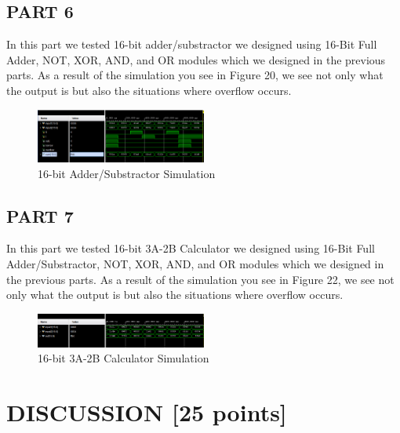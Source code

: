 \documentclass[pdftex,12pt,a4paper]{article}
\begin{document}
\subsection{PART 6}

In this part we tested 16-bit adder/substractor we designed using 16-Bit Full Adder, NOT, XOR, AND, and OR modules which we designed in the previous parts. As a result of the simulation you see in Figure 20, we see not only what the output is but also the situations where overflow occurs.


\begin{figure}[H]
    \centering
    \includegraphics[width=0.5\textwidth]{adder_substractor_sim.png}
    \caption{16-bit Adder/Substractor Simulation}
\end{figure}

\subsection{PART 7}

In this part we tested 16-bit 3A-2B Calculator we designed using 16-Bit Full Adder/Substractor, NOT, XOR, AND, and OR modules which we designed in the previous parts. As a result of the simulation you see in Figure 22, we see not only what the output is but also the situations where overflow occurs.


\begin{figure}[H]
    \centering
    \includegraphics[width=0.5\textwidth]{part7_sim.png}
    \caption{16-bit 3A-2B Calculator Simulation}
\end{figure}


\section{DISCUSSION [25 points]}
\end{document}
